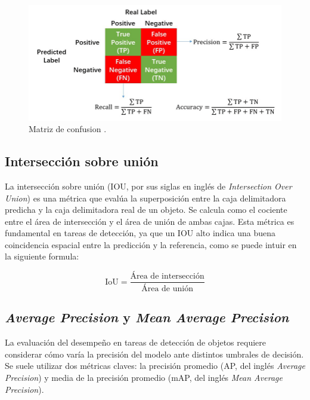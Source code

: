 \begin{figure}[htpb]
	\centering
	\includegraphics[scale=0.5]{./Figures/precision-recall-accuracy.png}
	\caption{Matriz de confusion \protect\footnotemark.}
	\label{fig:presicion-recall-accuracy}
\end{figure}


\subsection{Intersección sobre unión}

La intersección sobre unión (IOU, por sus siglas en inglés de \textit{Intersection Over Union}) es una métrica que evalúa la superposición entre la caja delimitadora predicha y la caja delimitadora real de un objeto. Se calcula como el cociente entre el área de intersección y el área de unión de ambas cajas. Esta métrica es fundamental en tareas de detección, ya que un IOU alto indica una buena coincidencia espacial entre la predicción y la referencia, como se puede intuir en la siguiente formula:

\begin{equation}
	\text{IoU} = \frac{\text{Área de intersección}}{\text{Área de unión}}
	\label{eq:iou}
\end{equation}

\subsection{\textit{Average Precision} y \textit{Mean Average Precision}}

La evaluación del desempeño en tareas de detección de objetos requiere considerar cómo varía la precisión del modelo ante distintos umbrales de decisión. Se suele utilizar dos métricas claves: la precisión promedio (AP, del inglés \textit{Average Precision}) y media de la precisión promedio (mAP, del inglés \textit{Mean Average Precision}).

